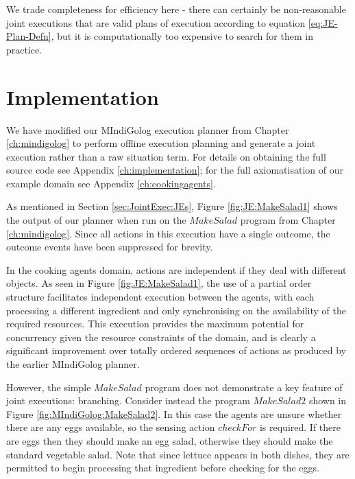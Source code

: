 We trade completeness for efficiency here - there can certainly be
non-reasonable joint executions that are valid plans of execution
according to equation \eqref{eq:JE-Plan-Defn}, but it is computationally
too expensive to search for them in practice.


\section{Implementation\label{sec:JointExec:Implementation}}

We have modified our MIndiGolog execution planner from Chapter \ref{ch:mindigolog}
to perform offline execution planning and generate a joint execution
rather than a raw situation term. For details on obtaining the full
source code see Appendix \ref{ch:implementation}; for the full axiomatisation
of our example domain see Appendix \ref{ch:cookingagents}.

As mentioned in Section \ref{sec:JointExec:JEs}, Figure \ref{fig:JE:MakeSalad1}
shows the output of our planner when run on the $MakeSalad$ program
from Chapter \ref{ch:mindigolog}. Since all actions in this execution
have a single outcome, the outcome events have been suppressed for
brevity.

In the cooking agents domain, actions are independent if they deal
with different objects. As seen in Figure \ref{fig:JE:MakeSalad1},
the use of a partial order structure facilitates independent execution
between the agents, with each processing a different ingredient and
only synchronising on the availability of the required resources.
This execution provides the maximum potential for concurrency given
the resource constraints of the domain, and is clearly a significant
improvement over totally ordered sequences of actions as produced
by the earlier MIndiGolog planner.

However, the simple $MakeSalad$ program does not demonstrate a key
feature of joint executions: branching. Consider instead the program
$MakeSalad2$ shown in Figure \ref{fig:MIndiGolog:MakeSalad2}. In
this case the agents are unsure whether there are any eggs available,
so the sensing action $checkFor$ is required. If there are eggs then
they should make an egg salad, otherwise they should make the standard
vegetable salad. Note that since lettuce appears in both dishes, they
are permitted to begin processing that ingredient before checking
for the eggs.

